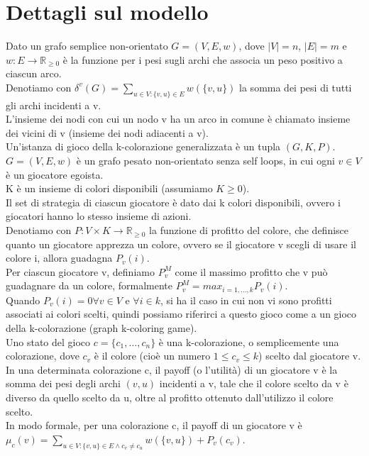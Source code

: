\section{Dettagli sul modello}
\justify
Dato un grafo semplice non-orientato \(G = (V, E, w)\), dove \(|V| = n\), \(|E| = m\) e \(w : E\rightarrow\mathds{R}_{\geq 0}\) è la funzione per i pesi sugli archi che associa un peso positivo a ciascun arco.\\
Denotiamo con \(\delta^v (G) = \sum_{u \in V : \{v, u\} \in E} w(\{v, u\})\) la somma dei pesi di tutti gli archi incidenti a v.\\
L'insieme dei nodi con cui un nodo v ha un arco in comune è chiamato insieme dei vicini di v (insieme dei nodi adiacenti a v).\\
Un'istanza di gioco della k-colorazione generalizzata è un tupla \((G, K, P)\). \(G = (V, E, w)\) è un grafo pesato non-orientato senza self loops, in cui ogni \(v \in V\) è un giocatore egoista.\\
K è un insieme di colori disponibili (assumiamo \(K \geq 0\)).\\
Il set di strategia di ciascun giocatore è dato dai k colori disponibili, ovvero i giocatori hanno lo stesso insieme di azioni.\\
Denotiamo con \(P : V \times K \rightarrow \mathds{R}_{\geq 0}\) la funzione di profitto del colore, che definisce quanto un giocatore apprezza un colore, ovvero se il giocatore v scegli di usare il colore i, allora guadagna \(P_v (i)\).\\
Per ciascun giocatore v, definiamo \(P_v^M\) come il massimo profitto che v può guadagnare da un colore, formalmente \(P_v^M = max_{i=1,\ldots,k} P_v (i)\).\\
Quando \(P_v (i) = 0 \forall v \in V\) e \(\forall i \in k\), si ha il caso in cui non vi sono profitti associati ai colori scelti, quindi possiamo riferirci a questo gioco come a un gioco della k-colorazione (graph k-coloring game).\\
Uno stato del gioco \(c = \{c_1,\ldots,c_n\}\) è una k-colorazione, o semplicemente una colorazione, dove \(c_v\) è il colore (cioè un numero \(1 \leq c_v \leq k\)) scelto dal giocatore v.\\
In una determinata colorazione c, il payoff (o l'utilità) di un giocatore v è la somma dei pesi degli archi \((v, u)\) incidenti a v, tale che il colore scelto da v è diverso da quello scelto da u, oltre al profitto ottenuto dall'utilizzo il colore scelto.\\
In modo formale, per una colorazione c, il payoff di un giocatore v è \(\mu_c (v) = \sum_{u \in V:\{v, u\} \in E \wedge c_v \neq c_u} w(\{v, u\}) + P_v(c_v)\).\\
